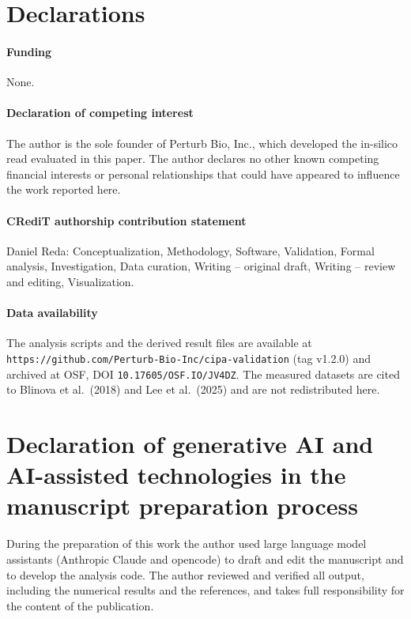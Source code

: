 \documentclass[preprint,12pt]{elsarticle}
\begin{document}
\section*{Declarations}
\paragraph{Funding} None.
\paragraph{Declaration of competing interest} The author is the sole founder of
Perturb Bio, Inc., which developed the in-silico read evaluated in this paper. The
author declares no other known competing financial interests or personal
relationships that could have appeared to influence the work reported here.
\paragraph{CRediT authorship contribution statement} Daniel Reda: Conceptualization,
Methodology, Software, Validation, Formal analysis, Investigation, Data curation,
Writing -- original draft, Writing -- review and editing, Visualization.
\paragraph{Data availability} The analysis scripts and the derived result files are
available at \texttt{https://github.com/Perturb-Bio-Inc/cipa-validation} (tag v1.2.0)
and archived at OSF, DOI \texttt{10.17605/OSF.IO/JV4DZ}. The measured datasets are
cited to Blinova et al.\ (2018) and Lee et al.\ (2025) and are not redistributed here.
\section*{Declaration of generative AI and AI-assisted technologies in the manuscript preparation process}
During the preparation of this work the author used large language model assistants
(Anthropic Claude and opencode) to draft and edit the manuscript and to develop the
analysis code. The author reviewed and verified all output, including the numerical
results and the references, and takes full responsibility for the content of the
publication.
\end{document}
